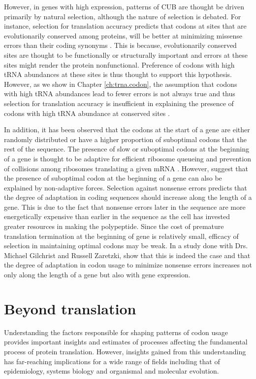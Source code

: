 However, in genes with high expression, patterns of CUB are thought be driven primarily by natural selection, although the nature of selection is debated.
For instance, selection for translation accuracy predicts that codons at sites that are evolutionarily conserved among proteins, will be better at minimizing missense errors than their coding synonyms \citep{Akashi94,AravaEtAl05,DrummondAndWilke08}.
This is because, evolutionarily conserved sites are thought to be functionally or structurally important and errors at these sites might render the protein nonfunctional.
Preference of codons with high tRNA abundances at these sites is thus thought to support this hypothesis.
However, as we show in Chapter \ref{ch:trna.codon}, the assumption that codons with high tRNA abundances lead to fewer errors is not always true and thus selection for translation accuracy is insufficient in explaining the presence of codons with high tRNA abundance at conserved sites \citep{ShahAndGilchrist10b}.

In addition, it has been observed that the codons at the start of a gene are either randomly distributed or have a higher proportion of suboptimal codons that the rest of the sequence.
The presence of slow or suboptimal codons at the beginning of a gene is thought to be adaptive for efficient ribosome queueing and prevention of collisions among ribosomes translating a given mRNA \citep{TullerEtAl10b}.
However, \citep{QinEtAl04,Gilchrist07,GilchristEtAl09} suggest that the presence of suboptimal codon at the beginning of a gene can also be explained by non-adaptive forces.
Selection against nonsense errors predicts that the degree of adaptation in coding sequences should increase along the length of a gene.
This is due to the fact that nonsense errors later in the sequence are more energetically expensive than earlier in the sequence as the cell has invested greater resources in making the polypeptide.
Since the cost of premature translation termination at the beginning of gene is relatively small, efficacy of selection in maintaining optimal codons may be weak.
In a study done with Drs. Michael Gilchrist and Russell Zaretzki, \citet{GilchristEtAl09} show that this is indeed the case and that the degree of adaptation in codon usage to minimize nonsense errors increases not only along the length of a gene but also with gene expression.

\section{Beyond translation}
Understanding the factors responsible for shaping patterns of codon usage provides important insights and estimates of processes affecting the fundamental process of protein translation.
However, insights gained from this understanding has far-reaching implications for a wide range of fields including that of epidemiology, systems biology and organismal and molecular evolution.

